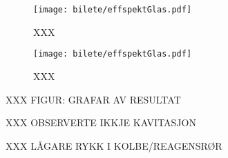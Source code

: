 \begin{figure}[htbp]
\centering
\texttt{[image: bilete/effspektGlas.pdf]}
\caption[Effektspektrum av måletank utan glaskolbe]{XXX}
\label{fig:effektvatn}
\end{figure}

\begin{figure}[htbp]
\centering
\texttt{[image: bilete/effspektGlas.pdf]}
\caption[Effektspektrum av måletank med glaskolbe]{XXX}
\label{fig:effektglas}
\end{figure}



XXX FIGUR: GRAFAR AV RESULTAT

XXX OBSERVERTE IKKJE KAVITASJON

XXX LÅGARE RYKK I KOLBE/REAGENSRØR
